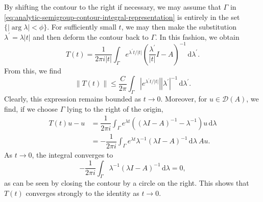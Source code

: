 By shifting the contour to the right if necessary, we may assume that $\Gamma$ in \eqref{eq:analytic-semigroup-contour-integral-representation} is entirely in the set $\{|\arg\lambda|<\phi\}$. For sufficiently small $t$, we may then make the substitution $\lambda^{\prime}=\lambda|t|$ and then deform the contour back to $\Gamma$. In this fashion, we obtain
\begin{equation}\label{eq:analytic-semigroup-contour-rescaled-at-small-time}
T(t)=\dfrac{1}{2\pi i|t|}\int_\Gamma e^{\lambda^{\prime}t/|t|}\left(\dfrac{\lambda^{\prime}}{|t|}I-A\right)^{-1}\,\mathrm{d}\lambda^{\prime}.
\end{equation}
From this, we find
\begin{equation}\label{eq:analytic-semigroup-small-time-contour-norm-bound}
\|T(t)\|\leq\dfrac{C}{2\pi}\int_\Gamma|e^{\lambda^{\prime}t/|t|}||\lambda^{\prime}|^{-1}\,\mathrm{d}\lambda^{\prime}.
\end{equation}
Clearly, this expression remains bounded as $t\to0$. Moreover, for $u\in\mathcal{D}(A)$, we find, if we choose $\Gamma$ lying to the right of the origin,\[\begin{aligned}
T(t)u-u&=\dfrac{1}{2\pi i}\int_\Gamma e^{\lambda t}((\lambda I-A)^{-1}-\lambda^{-1})u\,\mathrm{d}\lambda\\
&=-\dfrac{1}{2\pi i}\int_\Gamma e^{\lambda t}\lambda^{-1}(\lambda I-A)^{-1}\,\mathrm{d}\lambda\ Au.
\end{aligned}\]As $t\to0$, the integral converges to
\begin{equation}\label{eq:analytic-semigroup-origin-contour-zero-integral}
-\dfrac{1}{2\pi i}\int_\Gamma\lambda^{-1}(\lambda I-A)^{-1}\,\mathrm{d}\lambda=0,
\end{equation}
as can be seen by closing the contour by a circle on the right. This shows that $T(t)$ converges strongly to the identity as $t\to0$.

